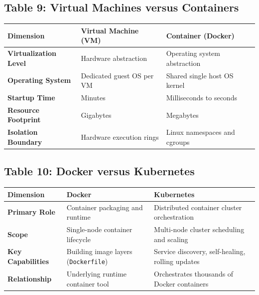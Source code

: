 \subsection*{Table 9: Virtual Machines versus Containers}
\begin{center}
\small
\begin{tabularx}{\textwidth}{lXX}
\toprule
\textbf{Dimension} & \textbf{Virtual Machine (VM)} & \textbf{Container (Docker)} \\
\midrule
\textbf{Virtualization Level} & Hardware abstraction & Operating system abstraction \\
\textbf{Operating System} & Dedicated guest OS per VM & Shared single host OS kernel \\
\textbf{Startup Time} & Minutes & Milliseconds to seconds \\
\textbf{Resource Footprint} & Gigabytes & Megabytes \\
\textbf{Isolation Boundary} & Hardware execution rings & Linux namespaces and cgroups \\
\bottomrule
\end{tabularx}
\end{center}

\subsection*{Table 10: Docker versus Kubernetes}
\begin{center}
\small
\begin{tabularx}{\textwidth}{lXX}
\toprule
\textbf{Dimension} & \textbf{Docker} & \textbf{Kubernetes} \\
\midrule
\textbf{Primary Role} & Container packaging and runtime & Distributed container cluster orchestration \\
\textbf{Scope} & Single-node container lifecycle & Multi-node cluster scheduling and scaling \\
\textbf{Key Capabilities} & Building image layers (\texttt{Dockerfile}) & Service discovery, self-healing, rolling updates \\
\textbf{Relationship} & Underlying runtime container tool & Orchestrates thousands of Docker containers \\
\bottomrule
\end{tabularx}
\end{center}

